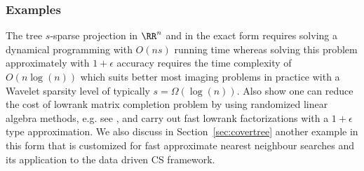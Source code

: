 \subsubsection*{Examples}
The tree $s$-sparse projection in $\RR^n$ and in the exact form requires solving a dynamical programming with $O(ns)$ running time \cite{DRthompson} whereas solving this problem approximately with $1+\epsilon$ accuracy requires the time complexity of $O(n\log(n))$ \cite{HegdeISIT} which suits better most imaging problems in practice with a Wavelet sparsity level of typically $s=\Omega(\log(n))$. Also \cite{StoIHT,MatrixAlpsapprox} show one can reduce the cost of lowrank matrix completion problem by using randomized linear algebra methods, e.g. see \cite{Deshpande2006,HalkoTropp}, and carry out fast lowrank factorizations with a $1+\epsilon$ type approximation. 
We also discuss in Section~\ref{sec:covertree} another example 
in this form that is customized for fast approximate nearest neighbour searches and its 
application to the data driven CS framework.



 

 

